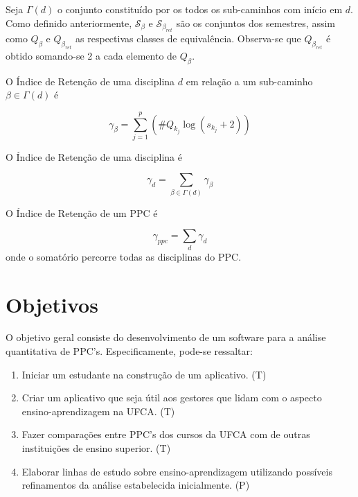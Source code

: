 \documentclass[a4paper, 12pt]{article}
\begin{document}
Seja $\Gamma(d)$ o conjunto constituído por os todos os sub-caminhos com início em $d$. Como definido anteriormente, $\mathcal{S}_\beta$ e 
$\mathcal{S}_{\beta_{ret}}$ são os conjuntos dos semestres, assim como $Q_\beta$ e $Q_{\beta_{ret}}$ as respectivas classes de 
equivalência. Observa-se que $Q_{\beta_{ret}}$ é obtido somando-se 2 a cada elemento de $Q_\beta$.

\begin{definicao}
O Índice de Retenção de uma disciplina $d$ em relação a um sub-caminho $\beta \in \Gamma(d)$ é

$$ \gamma_{\beta} = \sum_{j = 1}^{p}(\#Q_{k_j} \log(s_{k_j}+2)) $$
\end{definicao}

\begin{definicao}
O Índice de Retenção de uma disciplina é

$$ \gamma_d = \sum_{\beta \in \Gamma(d)} \gamma_\beta $$
\end{definicao}

\begin{definicao}
O Índice de Retenção de um PPC é

$$ \gamma_{ppc} = \sum_{d} \gamma_d $$
onde o somatório percorre todas as disciplinas do PPC.
\end{definicao}

\section*{Objetivos}

O objetivo geral consiste do desenvolvimento de um software para a análise quantitativa de PPC's. Especificamente, pode-se ressaltar: 

\begin{enumerate}
\item Iniciar um estudante na construção de um aplicativo. (T)
\item Criar um aplicativo que seja útil aos gestores que lidam com o aspecto ensino-aprendizagem na UFCA. (T)
\item Fazer comparações entre PPC's dos cursos da UFCA com de outras instituições de ensino superior. (T)
\item Elaborar linhas de estudo sobre ensino-aprendizagem utilizando possíveis refinamentos da análise estabelecida inicialmente. (P)
\end{enumerate}

\begin{enumerate}

\end{enumerate}
\end{document}
